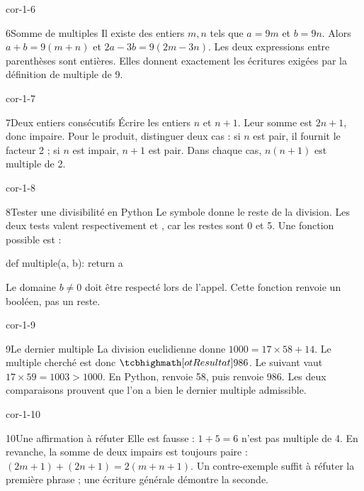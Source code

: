 \begin{blocLivre}{cor-1-6}
\begin{corrige}{6}{Somme de multiples}
Il existe des entiers $m,n$ tels que $a=9m$ et $b=9n$. Alors $a+b=9(m+n)$ et $2a-3b=9(2m-3n)$. Les deux expressions entre parenthèses sont entières. Elles donnent exactement les écritures exigées par la définition de multiple de 9.
\end{corrige}
\end{blocLivre}
\begin{blocLivre}{cor-1-7}
\begin{corrige}{7}{Deux entiers consécutifs}
Écrire les entiers $n$ et $n+1$. Leur somme est $2n+1$, donc impaire. Pour le produit, distinguer deux cas : si $n$ est pair, il fournit le facteur 2 ; si $n$ est impair, $n+1$ est pair. Dans chaque cas, $n(n+1)$ est multiple de 2.
\end{corrige}
\end{blocLivre}
\begin{blocLivre}{cor-1-8}
\begin{corrige}{8}{Tester une divisibilité en Python}
Le symbole \code{\%} donne le reste de la division. Les deux tests valent respectivement  et , car les restes sont 0 et 5. Une fonction possible est :
\begin{python}
def multiple(a, b):
    return a %
\end{python}
Le domaine $b\ne0$ doit être respecté lors de l’appel. Cette fonction renvoie un booléen, pas un reste.
\end{corrige}
\end{blocLivre}
\begin{blocLivre}{cor-1-9}
\begin{corrige}{9}{Le dernier multiple}
La division euclidienne donne $1000=17\times58+14$. Le multiple cherché est donc $\res{986}$. Le suivant vaut $17\times59=1003>1000$. En Python,  renvoie 58, puis  renvoie 986. Les deux comparaisons prouvent que l’on a bien le dernier multiple admissible.
\end{corrige}
\end{blocLivre}
\begin{blocLivre}{cor-1-10}
\begin{corrige}{10}{Une affirmation à réfuter}
Elle est fausse : $1+5=6$ n’est pas multiple de 4. En revanche, la somme de deux impairs est toujours paire : $(2m+1)+(2n+1)=2(m+n+1)$. Un contre-exemple suffit à réfuter la première phrase ; une écriture générale démontre la seconde.
\end{corrige}
\end{blocLivre}
